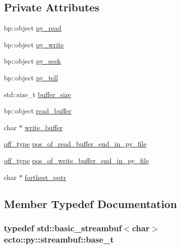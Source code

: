 \subsection*{Private Attributes}
\begin{DoxyCompactItemize}
\item 
bp\+::object \hyperlink{classecto_1_1py_1_1streambuf_a77a192df96e66a2e19cdfce078017df8}{py\+\_\+read}
\item 
bp\+::object \hyperlink{classecto_1_1py_1_1streambuf_aad739c2392d3c8f0de7d44719c7cc37a}{py\+\_\+write}
\item 
bp\+::object \hyperlink{classecto_1_1py_1_1streambuf_ad4e0dc91a74411d2181897d026ff945b}{py\+\_\+seek}
\item 
bp\+::object \hyperlink{classecto_1_1py_1_1streambuf_a3735b9e199be3e58c277354127a86146}{py\+\_\+tell}
\item 
std\+::size\+\_\+t \hyperlink{classecto_1_1py_1_1streambuf_a8d60fa297a9140474d136a48342ac850}{buffer\+\_\+size}
\item 
bp\+::object \hyperlink{classecto_1_1py_1_1streambuf_ac239012691e5d3485572159a53600005}{read\+\_\+buffer}
\item 
char $\ast$ \hyperlink{classecto_1_1py_1_1streambuf_a331e541fac616ac9ac3a81fb117057c6}{write\+\_\+buffer}
\item 
\hyperlink{classecto_1_1py_1_1streambuf_aa01772d1599fc51089a209a69fcab7c7}{off\+\_\+type} \hyperlink{classecto_1_1py_1_1streambuf_a7b219ca66aa176fdfbc9d6fb63d15cef}{pos\+\_\+of\+\_\+read\+\_\+buffer\+\_\+end\+\_\+in\+\_\+py\+\_\+file}
\item 
\hyperlink{classecto_1_1py_1_1streambuf_aa01772d1599fc51089a209a69fcab7c7}{off\+\_\+type} \hyperlink{classecto_1_1py_1_1streambuf_a1775b9bced7a5ff74fe30c788e20ad9e}{pos\+\_\+of\+\_\+write\+\_\+buffer\+\_\+end\+\_\+in\+\_\+py\+\_\+file}
\item 
char $\ast$ \hyperlink{classecto_1_1py_1_1streambuf_a8267e360cfb0201b1518a0dfd3d7c353}{farthest\+\_\+pptr}
\end{DoxyCompactItemize}


\subsection{Member Typedef Documentation}
\hypertarget{classecto_1_1py_1_1streambuf_ac46c69e7d213fec69f80d1943389366c}{}
\subsubsection[{base\+\_\+t}]{\setlength{\rightskip}{0pt plus 5cm}typedef std\+::basic\+\_\+streambuf$<$char$>$ {\bf ecto\+::py\+::streambuf\+::base\+\_\+t}\hspace{0.3cm}{\ttfamily [private]}}\label{classecto_1_1py_1_1streambuf_ac46c69e7d213fec69f80d1943389366c}
\hypertarget{classecto_1_1py_1_1streambuf_acd255be6a50678c600c431c5bea7bc7b}{}
